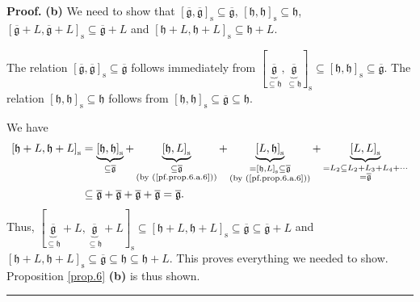 \documentclass[numbers=enddot,12pt,final,onecolumn,notitlepage]{scrartcl}%
\theoremstyle{definition}
\newenvironment{proof}[1][Proof]{\noindent\textbf{#1.} }{\ \rule{0.5em}{0.5em}}
\begin{document}
\begin{proof}
\textbf{(b)} We need to show that $\left[  \overline{\mathfrak{g}}%
,\overline{\mathfrak{g}}\right]  _{\operatorname*{s}}\subseteq\overline
{\mathfrak{g}}$, $\left[  \mathfrak{h},\mathfrak{h}\right]
_{\operatorname*{s}}\subseteq\mathfrak{h}$, $\left[  \overline{\mathfrak{g}%
}+L,\overline{\mathfrak{g}}+L\right]  _{\operatorname*{s}}\subseteq
\overline{\mathfrak{g}}+L$ and $\left[  \mathfrak{h}+L,\mathfrak{h}+L\right]
_{\operatorname*{s}}\subseteq\mathfrak{h}+L$.

The relation $\left[  \overline{\mathfrak{g}},\overline{\mathfrak{g}}\right]
_{\operatorname*{s}}\subseteq\overline{\mathfrak{g}}$ follows immediately from
$\left[  \underbrace{\overline{\mathfrak{g}}}_{\subseteq\mathfrak{h}%
},\underbrace{\overline{\mathfrak{g}}}_{\subseteq\mathfrak{h}}\right]
_{\operatorname*{s}}\subseteq\left[  \mathfrak{h},\mathfrak{h}\right]
_{\operatorname*{s}}\subseteq\overline{\mathfrak{g}}$. The relation $\left[
\mathfrak{h},\mathfrak{h}\right]  _{\operatorname*{s}}\subseteq\mathfrak{h}$
follows from $\left[  \mathfrak{h},\mathfrak{h}\right]  _{\operatorname*{s}%
}\subseteq\overline{\mathfrak{g}}\subseteq\mathfrak{h}$.

We have%
\begin{align*}
\left[  \mathfrak{h}+L,\mathfrak{h}+L\right]  _{\operatorname*{s}}  &
=\underbrace{\left[  \mathfrak{h},\mathfrak{h}\right]  _{\operatorname*{s}}%
}_{\subseteq\overline{\mathfrak{g}}}+\underbrace{\left[  \mathfrak{h}%
,L\right]  _{\operatorname*{s}}}_{\substack{\subseteq\overline{\mathfrak{g}%
}\\\text{(by (\ref{pf.prop.6.a.6}))}}}+\underbrace{\left[  L,\mathfrak{h}%
\right]  _{\operatorname*{s}}}_{\substack{=\left[  \mathfrak{h},L\right]
_{\operatorname*{s}}\subseteq\overline{\mathfrak{g}}\\\text{(by
(\ref{pf.prop.6.a.6}))}}}+\underbrace{\left[  L,L\right]  _{\operatorname*{s}%
}}_{\substack{=L_{2}\subseteq L_{2}+L_{3}+L_{4}+\cdots\\=\overline
{\mathfrak{g}}}}\\
&  \subseteq\overline{\mathfrak{g}}+\overline{\mathfrak{g}}+\overline
{\mathfrak{g}}+\overline{\mathfrak{g}}=\overline{\mathfrak{g}}.
\end{align*}
Thus, $\left[  \underbrace{\overline{\mathfrak{g}}}_{\subseteq\mathfrak{h}%
}+L,\underbrace{\overline{\mathfrak{g}}}_{\subseteq\mathfrak{h}}+L\right]
_{\operatorname*{s}}\subseteq\left[  \mathfrak{h}+L,\mathfrak{h}+L\right]
_{\operatorname*{s}}\subseteq\overline{\mathfrak{g}}\subseteq\overline
{\mathfrak{g}}+L$ and $\left[  \mathfrak{h}+L,\mathfrak{h}+L\right]
_{\operatorname*{s}}\subseteq\overline{\mathfrak{g}}\subseteq\mathfrak{h}%
\subseteq\mathfrak{h}+L$. This proves everything we needed to show.
Proposition \ref{prop.6} \textbf{(b)} is thus shown.
\end{proof}
\end{document}
